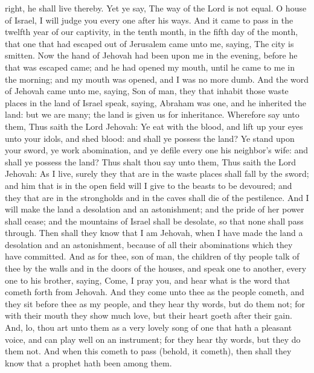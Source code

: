 right, he shall live thereby. Yet ye say, The way of the Lord is not equal. O house of Israel, I will judge you every one after his ways.  And it came to pass in the twelfth year of our captivity, in the tenth month, in the fifth day of the month, that one that had escaped out of Jerusalem came unto me, saying, The city is smitten. Now the hand of Jehovah had been upon me in the evening, before he that was escaped came; and he had opened my mouth, until he came to me in the morning; and my mouth was opened, and I was no more dumb.  And the word of Jehovah came unto me, saying, Son of man, they that inhabit those waste places in the land of Israel speak, saying, Abraham was one, and he inherited the land: but we are many; the land is given us for inheritance. Wherefore say unto them, Thus saith the Lord Jehovah: Ye eat with the blood, and lift up your eyes unto your idols, and shed blood: and shall ye possess the land? Ye stand upon your sword, ye work abomination, and ye defile every one his neighbor’s wife: and shall ye possess the land? Thus shalt thou say unto them, Thus saith the Lord Jehovah: As I live, surely they that are in the waste places shall fall by the sword; and him that is in the open field will I give to the beasts to be devoured; and they that are in the strongholds and in the caves shall die of the pestilence. And I will make the land a desolation and an astonishment; and the pride of her power shall cease; and the mountains of Israel shall be desolate, so that none shall pass through. Then shall they know that I am Jehovah, when I have made the land a desolation and an astonishment, because of all their abominations which they have committed.  And as for thee, son of man, the children of thy people talk of thee by the walls and in the doors of the houses, and speak one to another, every one to his brother, saying, Come, I pray you, and hear what is the word that cometh forth from Jehovah. And they come unto thee as the people cometh, and they sit before thee as my people, and they hear thy words, but do them not; for with their mouth they show much love, but their heart goeth after their gain. And, lo, thou art unto them as a very lovely song of one that hath a pleasant voice, and can play well on an instrument; for they hear thy words, but they do them not. And when this cometh to pass (behold, it cometh), then shall they know that a prophet hath been among them. 

